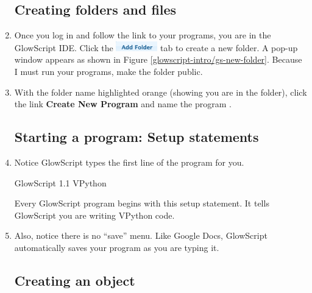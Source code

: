\begin{enumerate}

	\subsection*{Creating folders and files}
	
	\item Once you log in and follow the link to your programs, you are in the GlowScript IDE. Click the \includegraphics[scale=0.75]{glowscript-intro/gs-add-folder} tab to create a new folder. A pop-up window appears as shown in Figure \ref{glowscript-intro/gs-new-folder}. Because I must run your programs, make the folder public.
	
	


	\item With the folder name highlighted orange (showing you are in the folder), click the link {\bf Create New Program} and name the program .
	
		
	\subsection*{Starting a program:  Setup statements}
	
	\item Notice GlowScript types the first line of the program for you.
	
\begin{myvpython}
GlowScript 1.1 VPython
\end{myvpython}
	
Every GlowScript program begins with this setup statement. It tells GlowScript you are writing VPython code.

	\item Also, notice there is no ``save'' menu. Like Google Docs, GlowScript automatically saves your program as you are typing it. 
	
	\subsection*{Creating an object}


\end{enumerate}
